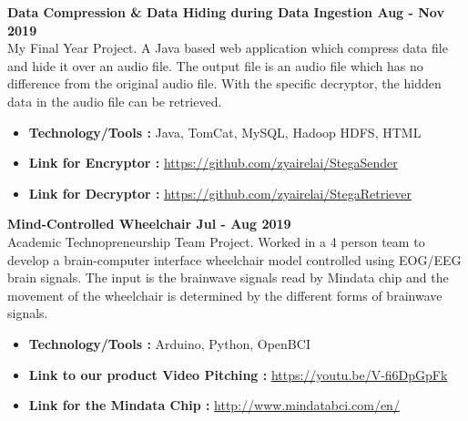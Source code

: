 \textbf{Data Compression \& Data Hiding during Data Ingestion \hfill Aug - Nov 2019} \vspace{0.1cm} \\
    My Final Year Project. A Java based web application which compress data file and hide it over an audio file. The output file is an audio file which has no difference from the original audio file. With the specific decryptor, the hidden data in the audio file can be retrieved. \vspace{0.3cm}
    \begin{itemize}
        \item \textbf{Technology/Tools :} Java, TomCat, MySQL, Hadoop HDFS, HTML
        \item \textbf{Link for Encryptor :} \url{https://github.com/zyairelai/StegaSender}
        \item \textbf{Link for Decryptor :} \url{https://github.com/zyairelai/StegaRetriever}
    \end{itemize}

\textbf{Mind-Controlled Wheelchair \hfill Jul - Aug 2019} \vspace{0.1cm} \\
    Academic Technopreneurship Team Project. Worked in a 4 person team to develop a brain-computer interface wheelchair model controlled using EOG/EEG brain signals. The input is the brainwave signals read by Mindata chip and the movement of the wheelchair is determined by the different forms of brainwave signals. \vspace{0.2cm}
    \begin{itemize}
        \item \textbf{Technology/Tools :} Arduino, Python, OpenBCI
        \item \textbf{Link to our product Video Pitching :} \url{https://youtu.be/V-fi6DpGpFk}
        \item \textbf{Link for the Mindata Chip :} \url{http://www.mindatabci.com/en/}
    \end{itemize}
